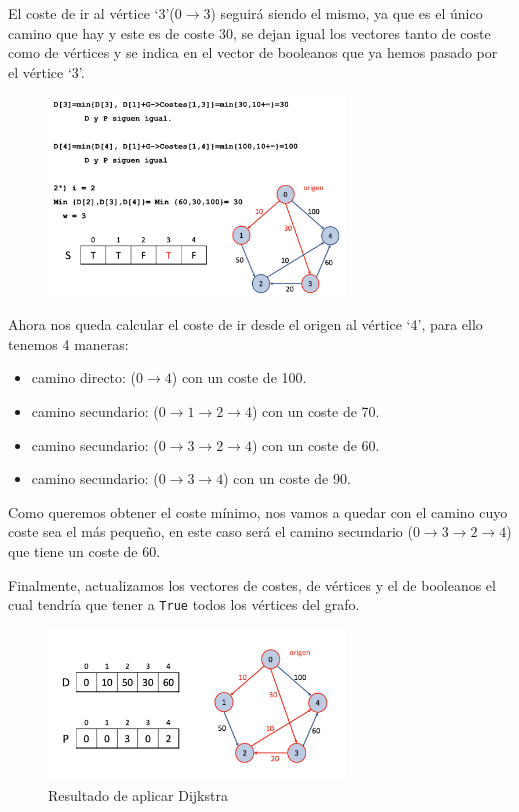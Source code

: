 El coste de ir al vértice `3'(\(0\rightarrow3\)) seguirá siendo el mismo, ya que es el único camino que hay y este es de coste 30, se dejan igual los vectores tanto de coste como de vértices y se indica en el vector de booleanos que ya hemos pasado por el vértice `3'.

\begin{figure}[h]
  \begin{center}
    \includegraphics[width=0.7\textwidth]{assets/dij6.png}
  \end{center}
\end{figure}

Ahora nos queda calcular el coste de ir desde el origen al vértice `4', para ello tenemos 4 maneras:
\begin{itemize}
  \item camino directo: (\(0\rightarrow4\)) con un coste de 100.
  \item camino secundario: (\(0\rightarrow1\rightarrow2\rightarrow4\)) con un coste de 70.
  \item camino secundario: (\(0\rightarrow3\rightarrow2\rightarrow4\)) con un coste de 60.
  \item camino secundario: (\(0\rightarrow3\rightarrow4\)) con un coste de 90.
\end{itemize}

Como queremos obtener el coste mínimo, nos vamos a quedar con el camino cuyo coste sea el más pequeño, en este caso será el camino secundario (\(0\rightarrow3\rightarrow2\rightarrow4\)) que tiene un coste de 60.

Finalmente, actualizamos los vectores de costes, de vértices y el de booleanos el cual tendría que tener a \texttt{True} todos los vértices del grafo.
\newpage
{}
\begin{figure}[h]
  \begin{center}
    \includegraphics[width=0.7\textwidth]{assets/dij8.png}
  \end{center}
  \caption{Resultado de aplicar Dijkstra}
\end{figure}
